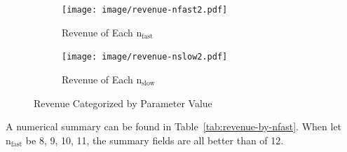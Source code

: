 \documentclass[12pt,a4paper]{article}
\begin{document}
%
%

\begin{figure}[htbp]
\begin{subfigure}[b]{.5\textwidth}
\centering
\texttt{[image: image/revenue-nfast2.pdf]}
\caption{Revenue of Each $\mathrm{n_{fast}}$}
\label{fig:revenue-by-par:nfast}
\end{subfigure}
\begin{subfigure}[b]{.5\textwidth}
\centering
\texttt{[image: image/revenue-nslow2.pdf]}
\caption{Revenue of Each $\mathrm{n_{slow}}$}
\label{fig:revenue-by-par:nslow}
\end{subfigure}
\caption{Revenue Categorized by Parameter Value}
\label{fig:revenue-by-par}
\end{figure}


A numerical summary can be found in Table~\ref{tab:revenue-by-nfast}.
When let $\mathrm{n_{fast}}$ be 8, 9, 10, 11, the summary fields are 
all better than of 12.
\end{document}
